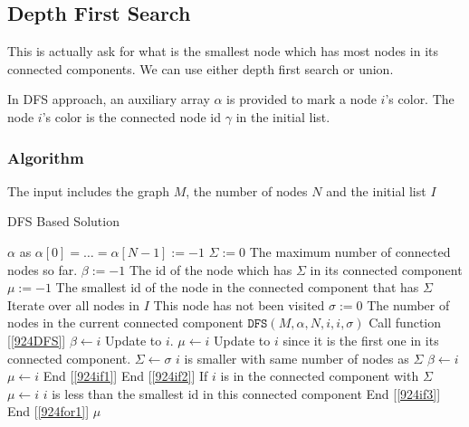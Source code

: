 \subsection{Depth First Search}
This is actually ask for what is the smallest node which has most nodes in its connected components. We can use either depth first search or union.
\par
In DFS approach, an auxiliary array $\alpha$ is provided to mark a node $i$'s color. The node $i$'s color is the connected node id $\gamma$ in the initial list.
\subsubsection{Algorithm}
The input includes the graph $M$, the number of nodes $N$ and the initial list $I$
\setcounter{algorithm}{0}
\begin{algorithm}[H]
\caption{DFS Based Solution}
\begin{algorithmic}[1]
\State $\alpha$ as $\alpha[0] = \ldots = \alpha[N-1] := -1$ 
\State $\Sigma := 0$ \Comment The maximum number of connected nodes so far.
\State $\beta := -1$ \Comment The id of the node which has $\Sigma$ in its connected component
\State $\mu:= -1$ \Comment The smallest id of the node in the connected component that has $\Sigma$
 \Comment Iterate over all nodes in $I$ \label{924for1}
 \Comment This node has not been visited \label{924if3}
\State $\sigma := 0$ \Comment The number of nodes in the current connected component
\State $\mathtt{DFS}(M, \alpha, N, i, i, \sigma)$ \Comment Call function [\ref{924DFS}]
\If{$\sigma > \Sigma$} \label{924if2}
\State $\beta \gets i$ \Comment Update to $i$.
\State $\mu \gets i$ \Comment Update to $i$  since it is the first one in its connected component.
\State $\Sigma \gets \sigma$
\ElsIf{$\sigma = \Sigma$}
 \Comment $i$ is smaller with same number of nodes as $\Sigma$ \label{924if1}
\State $\beta \gets i$
\State $\mu \gets i$
\EndIf \Comment End [\ref{924if1}]
\EndIf \Comment End [\ref{924if2}]
\Else
{} \Comment If $i$ is in the connected component with $\Sigma$
\State $\mu \gets i$ \Comment $i$ is less than the smallest id in this connected component
\EndIf
\EndIf \Comment End [\ref{924if3}]
\EndFor \Comment End [\ref{924for1}]
\State \Return $\mu$
\EndProcedure
\end{algorithmic}
\end{algorithm}

